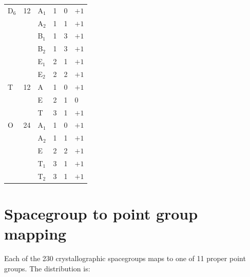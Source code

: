 \documentclass[aps,prb,onecolumn]{revtex4-2}
\begin{document}
\begin{table}[h]
\begin{ruledtabular}
\begin{tabular}{llllll}
D$_6$ & 12 & A$_1$   & 1       & 0       & $+1$ \\
      &    & A$_2$   & 1       & 1       & $+1$ \\
      &    & B$_1$   & 1       & 3       & $+1$ \\
      &    & B$_2$   & 1       & 3       & $+1$ \\
      &    & E$_1$   & 2       & 1       & $+1$ \\
      &    & E$_2$   & 2       & 2       & $+1$ \\
\midrule
T     & 12 & A       & 1       & 0       & $+1$ \\
      &    & E       & 2       & 1       & $0$  \\
      &    & T       & 3       & 1       & $+1$ \\
\midrule
O     & 24 & A$_1$   & 1       & 0       & $+1$ \\
      &    & A$_2$   & 1       & 1       & $+1$ \\
      &    & E       & 2       & 2       & $+1$ \\
      &    & T$_1$   & 3       & 1       & $+1$ \\
      &    & T$_2$   & 3       & 1       & $+1$ \\
\end{tabular}
\end{ruledtabular}
\end{table}

\section{Spacegroup to point group mapping}
\label{sec:spg-mapping}

Each of the 230 crystallographic spacegroups maps to one of 11
proper point groups. The distribution is:
\end{document}
